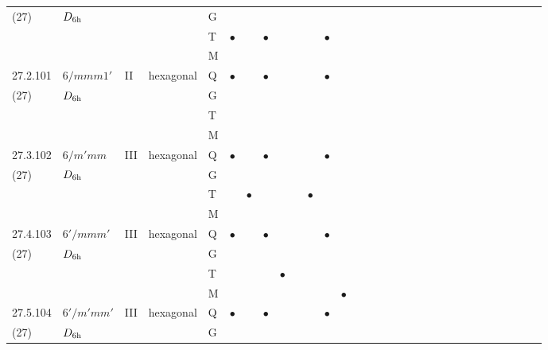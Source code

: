 \documentclass[fleqn,9pt,landscape]{jsarticle}
\begin{document}
\begin{longtable}{lllll|l|l|l|l|l|l|l|l|l|ll|ll|ll|ll|ll|ll|ll|ll}
(27) & $D_{\rm 6h}$ &  &  & G &  &  &  &  &  &  &  &  &  &  &  &  &  &  &  &  &  &  &  &  &  &  &  &  &  \\
 &  &  &  & T & $\bullet$ &  & $\bullet$ &  &  &  & $\bullet$ &  &  &  &  &  &  &  &  &  &  &  &  &  &  &  &  &  &  \\
 &  &  &  & M &  &  &  &  &  &  &  &  &  &  &  &  &  &  &  &  &  &  &  &  &  &  &  &  &  \\ \hline
27.2.101 & \texttt{$6/mmm1'$} & II & hexagonal & Q & $\bullet$ &  & $\bullet$ &  &  &  & $\bullet$ &  &  &  &  &  &  &  &  &  &  &  &  &  &  &  &  &  &  \\
(27) & $D_{\rm 6h}$ &  &  & G &  &  &  &  &  &  &  &  &  &  &  &  &  &  &  &  &  &  &  &  &  &  &  &  &  \\
 &  &  &  & T &  &  &  &  &  &  &  &  &  &  &  &  &  &  &  &  &  &  &  &  &  &  &  &  &  \\
 &  &  &  & M &  &  &  &  &  &  &  &  &  &  &  &  &  &  &  &  &  &  &  &  &  &  &  &  &  \\ \hline
27.3.102 & \texttt{$6/m'mm$} & III & hexagonal & Q & $\bullet$ &  & $\bullet$ &  &  &  & $\bullet$ &  &  &  &  &  &  &  &  &  &  &  &  &  &  &  &  &  &  \\
(27) & $D_{\rm 6h}$ &  &  & G &  &  &  &  &  &  &  &  &  &  &  &  &  &  &  &  &  &  &  &  &  &  &  &  &  \\
 &  &  &  & T &  & $\bullet$ &  &  &  & $\bullet$ &  &  &  &  &  &  &  &  &  &  &  &  &  &  &  &  &  &  &  \\
 &  &  &  & M &  &  &  &  &  &  &  &  &  &  &  &  &  &  &  &  &  &  &  &  &  &  &  &  &  \\ \hline
27.4.103 & \texttt{$6'/mmm'$} & III & hexagonal & Q & $\bullet$ &  & $\bullet$ &  &  &  & $\bullet$ &  &  &  &  &  &  &  &  &  &  &  &  &  &  &  &  &  &  \\
(27) & $D_{\rm 6h}$ &  &  & G &  &  &  &  &  &  &  &  &  &  &  &  &  &  &  &  &  &  &  &  &  &  &  &  &  \\
 &  &  &  & T &  &  &  & $\bullet$ &  &  &  &  &  &  &  &  &  &  &  &  &  &  &  &  &  &  &  &  &  \\
 &  &  &  & M &  &  &  &  &  &  &  & $\bullet$ &  &  &  &  &  &  &  &  &  &  &  &  &  &  &  &  &  \\ \hline
27.5.104 & \texttt{$6'/m'mm'$} & III & hexagonal & Q & $\bullet$ &  & $\bullet$ &  &  &  & $\bullet$ &  &  &  &  &  &  &  &  &  &  &  &  &  &  &  &  &  &  \\
(27) & $D_{\rm 6h}$ &  &  & G &  &  &  &  &  &  &  &  &  &  &  &  &  &  &  &  &  &  &  &  &  &  &  &  &  \\

\end{longtable}
\end{document}
